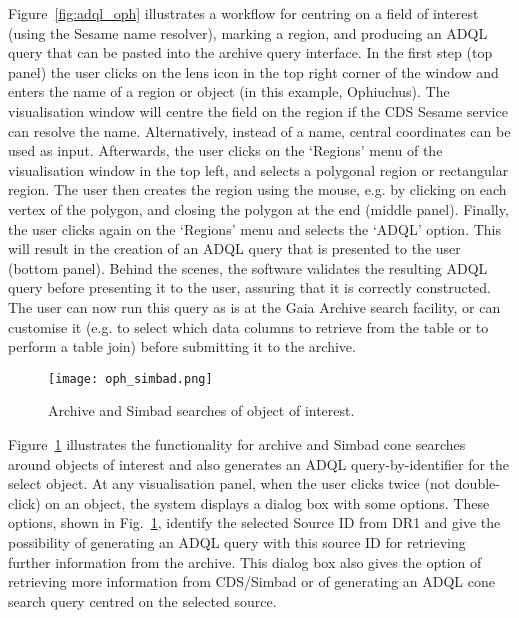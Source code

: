 \documentclass[longauth, final]{aa}
\begin{document}
Figure~\ref{fig:adql_oph} illustrates a workflow for centring on a field of interest (using the Sesame name resolver), marking a region, and producing an ADQL query that can be pasted into the archive query interface. In the first step (top panel) the user clicks on the lens icon in the top right corner of the window and enters the name of a region or object (in this example, Ophiuchus). The visualisation window will centre the field on the region if the CDS Sesame service can resolve the name. Alternatively, instead of a name, central coordinates can be used as input. Afterwards, the user clicks on the `Regions' menu of the visualisation window  in the top left, and selects a polygonal region or rectangular region. The user then creates the region using the mouse,  e.g. by clicking on each vertex of the polygon, and closing the polygon at the end (middle panel). Finally, the user clicks again on the `Regions' menu and selects the `ADQL' option. This will result in the creation of an ADQL query that is presented to the user (bottom panel). Behind the scenes, the software validates the resulting ADQL query before  presenting it to the user, assuring that it is correctly constructed. The user can now run this query as is at the Gaia Archive search facility, or can customise it (e.g. to select which data columns to retrieve from the table or to perform a table join) before submitting it to the archive.


\begin{figure}[!htbp]
\centering
    \texttt{[image: oph\_simbad.png]}
  \caption{Archive and Simbad searches of object of interest.}\label{fig:simbad_oph}
\end{figure}


Figure~\ref{fig:simbad_oph} illustrates the functionality for archive and Simbad cone searches around objects of interest and also generates an ADQL query-by-identifier for the select object. At any visualisation panel, when the user clicks twice (not double-click) on an object, the  system displays a dialog box with some options. These options, shown in Fig.~\ref{fig:simbad_oph}, identify the selected Source ID from DR1 and give the possibility of generating an ADQL query with this source ID for retrieving further information from the archive. This dialog box also gives the option of retrieving more information from CDS/Simbad or of generating an ADQL cone search query centred on the selected source. 
\end{document}

